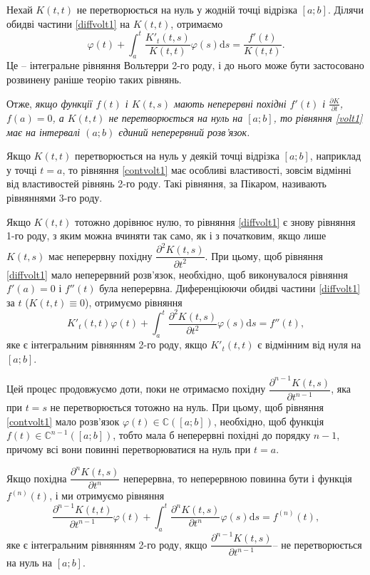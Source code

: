 \documentclass[14pt,twoside]{extreport}
\theoremstyle{mystyle}
\numberwithin{equation}{chapter}
\newcommand{\cab}{\mathbb{C}([a; b])}
\begin{document}
Нехай $K(t, t)$ не перетворюється на нуль у жодній точці відрізка $[a; b]$. Ділячи обидві частини \eqref{diffvolt1} на $K(t, t)$, отримаємо
\begin{equation}
\varphi(t) + \int_{a}^{t} \frac{K'_t(t, s)}{K(t, t)} \varphi(s) \mathrm{d}s = \frac{f'(t)}{K(t, t)}.
\end{equation}
Це -- інтегральне рівняння Вольтерри 2-го роду, і до нього може бути застосовано розвинену раніше теорію таких рівнянь.

Отже, \emph{якщо функції $f(t)$ і $K(t, s)$ мають неперервні похідні $f'(t)$ і $\frac{\partial K}{\partial t}$, $f(a) = 0$, а $K(t, t)$ не перетворюється на нуль на $[a; b]$, то рівняння \eqref{volt1} має на інтервалі $(a; b)$ єдиний неперервний розв'язок.}

Якщо $K(t, t)$ перетворюється на нуль у деякій точці відрізка $[a; b]$, наприклад у точці $t = a$, то рівняння \eqref{contvolt1} має особливі властивості, зовсім відмінні від властивостей рівнянь 2-го роду. Такі рівняння, за Пікаром, називають рівняннями 3-го роду.

Якщо $K(t, t)$ тотожно дорівнює нулю, то рівняння \eqref{diffvolt1} є знову рівняння 1-го роду, з яким можна вчиняти так само, як і з початковим, якщо лише $K(t, s)$ має неперервну похідну $\dfrac{\partial^2 K(t, s)}{\partial t^2}$. При цьому, щоб рівняння \eqref{diffvolt1} мало неперервний розв'язок, необхідно, щоб виконувалося рівняння $f'(a)=0$ і $f''(t)$ була неперервна. Диференціюючи обидві частини \eqref{diffvolt1} за $t$ ($K(t, t) \equiv 0$), отримуємо рівняння
\begin{equation}
 K'_t(t, t) \varphi(t) + \int_{a}^{t} \frac{\partial^2 K(t, s)}{\partial t^2} \varphi(s) \mathrm{d}s = f''(t),
\end{equation}
яке є інтегральним рівнянням 2-го роду, якщо $K'_t(t, t)$ є відмінним від нуля на $[a; b]$.

Цей процес продовжуємо доти, поки не отримаємо похідну $\dfrac{\partial^{n-1}K(t, s)}{\partial t^{n-1}}$, яка при $t=s$ не перетворюється тотожно на нуль. При цьому, щоб рівняння \eqref{contvolt1} мало розв'язок $\varphi(t) \in \cab$, необхідно, щоб функція $f(t) \in \mathbb{C}^{n-1}([a; b])$, тобто мала б неперервні похідні до порядку $n-1$, причому всі вони повинні перетворюватися на нуль при $t = a$.

Якщо похідна $\dfrac{\partial^{n}K(t, s)}{\partial t^{n}}$ неперервна, то неперервною повинна бути і функція $f^{(n)}(t)$, і ми отримуємо рівняння
\begin{equation}\label{nderiv}
\dfrac{\partial^{n-1}K(t, t)}{\partial t^{n-1}} \varphi(t) + \int_{a}^{t} \dfrac{\partial^{n}K(t, s)}{\partial t^{n}} \varphi(s) \mathrm{d}s = f^{(n)}(t),
\end{equation}
яке є інтегральним рівнянням 2-го роду, якщо $\dfrac{\partial^{n-1}K(t, s)}{\partial t^{n-1}}$-- не перетворюється на нуль на $[a; b]$.
\end{document}
